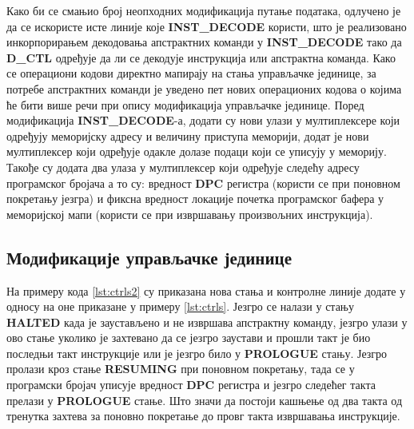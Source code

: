 Како би се смањио број неопходних модификација путање података, одлучено је да се искористе исте линије које \textbf{INST\_DECODE} користи, што је реализовано инкорпорирањем декодовања апстрактних команди у \textbf{INST\_DECODE} тако да \textbf{D\_CTL} одређује да ли се декодује инструкција или апстрактна команда. Како се операциони кодови директно мапирају на стања управљачке јединице, за потребе апстрактних команди је уведено пет нових операционих кодова о којима ће бити више речи при опису модификација управљачке јединице.
Поред модификација \textbf{INST\_DECODE}-а, додати су нови улази у мултиплексере који одређују меморијску адресу и величину приступа меморији, додат је нови мултиплексер који одређује одакле долазе подаци који се уписују у меморију. Такође су додата два улаза у мултиплексер који одређује следећу адресу програмског бројача а то су: вредност \textbf{\acrshort{DPC}} регистра (користи се при поновном покретању језгра) и фиксна вредност локације почетка програмског бафера у меморијској мапи (користи се при извршавању произвољних инструкција).

\subsection{Модификације управљачке јединице}

На примеру кода \ref{lst:ctrls2} су приказана нова стања и контролне линије додате у односу на оне приказане у примеру \ref{lst:ctrls}.
Језгро се налази у стању \textbf{HALTED} када је заустављено и не извршава апстрактну команду, језгро улази у ово стање уколико је захтевано да се језгро заустави и прошли такт је био последњи такт инструкције или је језгро било у \textbf{PROLOGUE} стању. Језгро пролази кроз стање \textbf{RESUMING} при поновном покретању, тада се у програмски бројач уписује вредност \textbf{\acrshort{DPC}} регистра и језгро следећег такта прелази у \textbf{PROLOGUE} стање. Што значи да постоји кашњење од два такта од тренутка захтева за поновно покретање до провг такта извршавања инструкције.



